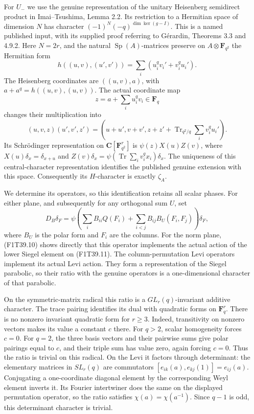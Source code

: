 For \(U_-\) we use the genuine representation of the
unitary Heisenberg semidirect product in
Imai--Tsushima, Lemma 2.2. Its restriction to a Hermitian
space of dimension \(N\) has character
\((-1)^N(-q)^{\dim\ker(g-I)}\). This is a named
published input, with its supplied proof referring to
G\'erardin, Theorems 3.3 and 4.9.2. Here \(N=2r\),
and the natural \(\operatorname{Sp}(A)\)-matrices preserve
on \(A\otimes\mathbf F_{q^2}\) the Hermitian form
\[
 h((u,v),(u',v'))=\sum_i(u_i^qv_i'+v_i^qu_i').
 \tag{F1T39.9}
\]
The Heisenberg coordinates are \(((u,v),a)\), with
\(a+a^q=h((u,v),(u,v))\). The actual coordinate map
\[
 z=a+\sum_i u_i^qv_i\in\mathbf F_q
 \tag{F1T39.10}
\]
changes their multiplication into
\[
 (u,v,z)(u',v',z')=
 (u+u',v+v',z+z'+\operatorname{Tr}_{q^2/q}\sum_i v_i^q u_i').
 \tag{F1T39.11}
\]
Its Schr\"odinger representation on \(\mathbf C[\mathbf F_{q^2}^r]\)
is \(\psi(z)X(u)Z(v)\), where
\(X(u)\delta_x=\delta_{x+u}\) and
\(Z(v)\delta_x=\psi(\operatorname{Tr}\sum_i v_i^qx_i)\delta_x\).
The uniqueness of this central-character representation
identifies the published genuine extension with this space.
Consequently its \(H\)-character is exactly \(\zeta_A\).

We determine its operators, so this identification retains
all scalar phases. For either plane, and subsequently for
any orthogonal sum \(U\), set
\[
 D_B\delta_F=\psi\!\left(
   \sum_iB_{ii}Q(F_i)+
   \sum_{i<j}B_{ij}B_U(F_i,F_j)\right)\delta_F,
 \tag{F1T39.12}
\]
where \(B_U\) is the polar form and \(F_i\) are the columns.
For the norm plane, (F1T39.10) shows directly that this
operator implements the actual action of the lower Siegel
element on (F1T39.11). The column-permutation Levi
operators implement its actual Levi action. They form a
representation of the Siegel parabolic, so their ratio with
the genuine operators is a one-dimensional character of
that parabolic.

On the symmetric-matrix radical this ratio is a
\(GL_r(q)\)-invariant additive character. The trace pairing
identifies its dual with quadratic forms on \(\mathbf F_q^r\).
There is no nonzero invariant quadratic form for \(r\ge3\).
Indeed, transitivity on nonzero vectors makes its value a
constant \(c\) there. For \(q>2\), scalar homogeneity
forces \(c=0\). For \(q=2\), the three basis vectors and
their pairwise sums give polar pairings equal to \(c\),
and their triple sum has value zero, again forcing \(c=0\).
Thus the ratio is trivial on this radical. On the Levi it
factors through determinant: the elementary matrices in
\(SL_r(q)\) are commutators
\([e_{ik}(a),e_{kj}(1)]=e_{ij}(a)\).
Conjugating a one-coordinate diagonal element by the
corresponding Weyl element inverts it. Its Fourier
intertwiner does the same on the displayed permutation
operator, so the ratio satisfies \(\chi(a)=\chi(a^{-1})\).
Since \(q-1\) is odd, this determinant character is trivial.

